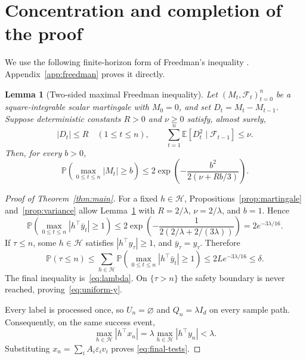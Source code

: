 \documentclass[11pt,a4paper]{article}
\numberwithin{equation}{section}
\newtheorem{lemma}[theorem]{Lemma}
\theoremstyle{remark}
\newcommand{\E}{\mathbb E}
\newcommand{\Pp}{\mathbb P}
\newcommand{\F}{\mathcal F}
\newcommand{\HH}{\mathcal H}
\begin{document}
\section{Concentration and completion of the proof}

We use the following finite-horizon form of Freedman's inequality
\cite{freedman1975}. Appendix~\ref{app:freedman} proves it directly.

\begin{lemma}[Two-sided maximal Freedman inequality]
\label{lem:freedman}
Let $(M_t,\F_t)_{t=0}^n$ be a square-integrable scalar martingale with
$M_0=0$, and set $D_t=M_t-M_{t-1}$. Suppose deterministic constants
$R>0$ and $\nu\ge0$ satisfy, almost surely,
\[
 |D_t|\le R\quad(1\le t\le n),\qquad
 \sum_{t=1}^n\E[D_t^2\mid\F_{t-1}]\le\nu.
\]
Then, for every $b>0$,
\begin{equation}\label{eq:freedman}
 \Pp\!\left(\max_{0\le t\le n}|M_t|\ge b\right)
 \le2\exp\!\left(-\frac{b^2}{2(\nu+Rb/3)}\right).
\end{equation}
\end{lemma}

\begin{proof}[Proof of Theorem~\ref{thm:main}]
For a fixed $h\in\HH$, Propositions~\ref{prop:martingale}
and~\ref{prop:variance} allow Lemma~\ref{lem:freedman} with
$R=2/\lambda$, $\nu=2/\lambda$, and $b=1$. Hence
\begin{equation}\label{eq:one-direction-tail}
 \Pp\!\left(\max_{0\le t\le n}|h^\top\bar y_t|\ge1\right)
 \le2\exp\!\left(-\frac{1}{2(2/\lambda+2/(3\lambda))}\right)
 =2e^{-3\lambda/16}.
\end{equation}
If $\tau\le n$, some $h\in\HH$ satisfies $|h^\top y_\tau|\ge1$, and
$\bar y_\tau=y_\tau$. Therefore
\begin{equation}\label{eq:failure-probability}
 \Pp(\tau\le n)
 \le\sum_{h\in\HH}
      \Pp\!\left(\max_{0\le t\le n}|h^\top\bar y_t|\ge1\right)
 \le2L e^{-3\lambda/16}\le\delta.
\end{equation}
The final inequality is~\eqref{eq:lambda}. On $\{\tau>n\}$ the safety
boundary is never reached, proving~\eqref{eq:uniform-y}.

Every label is processed once, so $U_n=\varnothing$ and
$Q_n=\lambda I_d$ on every sample path. Consequently, on the same
success event,
\[
 \max_{h\in\HH}|h^\top x_n|
 =\lambda\max_{h\in\HH}|h^\top y_n|<\lambda.
\]
Substituting $x_n=\sum_i A_i\varepsilon_i v_i$ proves
\eqref{eq:final-tests}.
\end{proof}
\end{document}
